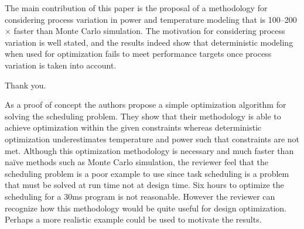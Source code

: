 \begin{reviewer}
The main contribution of this paper is the proposal of a methodology for
considering process variation in power and temperature modeling that is
100--200$\times$ faster than Monte Carlo simulation. The motivation for
considering process variation is well stated, and the results indeed show that
deterministic modeling when used for optimization fails to meet performance
targets once process variation is taken into account.
\end{reviewer}

\begin{authors}
Thank you.
\end{authors}

\begin{reviewer}
As a proof of concept the authors propose a simple optimization algorithm for
solving the scheduling problem. They show that their methodology is able to
achieve optimization within the given constraints whereas deterministic
optimization underestimates temperature and power such that constraints are not
met. Although this optimization methodology is necessary and much faster than
na\"{i}ve methods such as Monte Carlo simulation, the reviewer feel that the
scheduling problem is a poor example to use since task scheduling is a problem
that must be solved at run time not at design time. Six hours to optimize the
scheduling for a 30ms program is not reasonable. However the reviewer can
recognize how this methodology would be quite useful for design optimization.
Perhaps a more realistic example could be used to motivate the results.
\end{reviewer}

